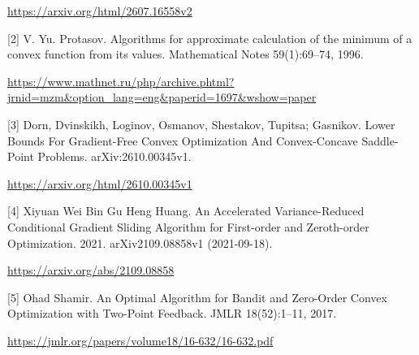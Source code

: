 \documentclass[10pt,a4paper]{article}
\begin{document}
\url{https://arxiv.org/html/2607.16558v2}

[2] V. Yu. Protasov. Algorithms for approximate calculation of the minimum of a convex function from its values. Mathematical Notes 59(1):69--74, 1996.

\url{https://www.mathnet.ru/php/archive.phtml?jrnid=mzm&option_lang=eng&paperid=1697&wshow=paper}

[3] Dorn, Dvinskikh, Loginov, Osmanov, Shestakov, Tupitsa; Gasnikov. Lower Bounds For Gradient-Free Convex Optimization And Convex-Concave Saddle-Point Problems. arXiv:2610.00345v1.

\url{https://arxiv.org/html/2610.00345v1}

[4] Xiyuan Wei
Bin Gu
Heng Huang. An Accelerated Variance-Reduced Conditional Gradient Sliding Algorithm for First-order and Zeroth-order Optimization. 2021. arXiv2109.08858v1 (2021-09-18).

\url{https://arxiv.org/abs/2109.08858}

[5] Ohad Shamir. An Optimal Algorithm for Bandit and Zero-Order Convex Optimization with Two-Point Feedback. JMLR 18(52):1--11, 2017.

\url{https://jmlr.org/papers/volume18/16-632/16-632.pdf}
\end{document}
